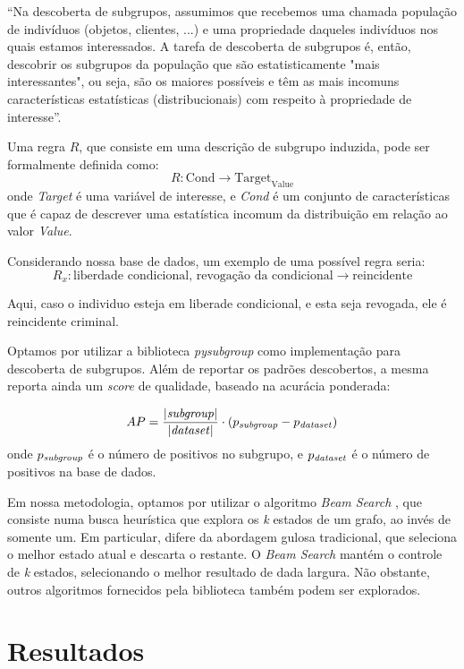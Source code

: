 \documentclass[12pt]{article}
\begin{document}
``Na descoberta de subgrupos, assumimos que recebemos uma chamada população de indivíduos
(objetos, clientes, ...) e uma propriedade daqueles indivíduos nos quais estamos interessados. A tarefa de descoberta de subgrupos é, então, descobrir os subgrupos da população que são estatisticamente "mais interessantes", ou seja, são os maiores possíveis e têm as mais incomuns características estatísticas (distribucionais) com respeito à propriedade de interesse''. \cite{Wrobel2001}

Uma regra $R$, que consiste em uma descrição de subgrupo induzida, pode ser formalmente
definida como: \cite{DBLP:journals/corr/abs-1106-4576}
\[
    R: \text{Cond} \rightarrow \text{Target}_{\text{Value}}
\]
onde \textit{Target} é uma variável de interesse, e \textit{Cond} é um conjunto de características que é capaz de descrever uma estatística incomum da distribuição em relação ao valor \textit{Value}.

Considerando nossa base de dados, um exemplo de uma possível regra seria:
\[
    R_x: \text{liberdade condicional, revogação da condicional} \rightarrow \text{reincidente}
\]

Aqui, caso o individuo esteja em liberade condicional, e esta seja revogada, ele é reincidente criminal.

Optamos por utilizar a biblioteca \textit{pysubgroup} \cite{lemmerich2018pysubgroup} como implementação para descoberta de subgrupos. Além de reportar os padrões descobertos, a mesma reporta ainda um \textit{score} de qualidade, baseado na acurácia ponderada:

\[
    AP = \frac{|\text{\textit{subgroup}}|}{|\text{\textit{dataset}}|} \cdot (p_{\text{\textit{subgroup}}} - p_{\text{\textit{dataset}}})
\]
onde $p_{\text{\textit{subgroup}}}$ é o número de positivos no subgrupo, e $p_{\text{\textit{dataset}}}$ é o número de positivos na base de dados.

Em nossa metodologia, optamos por utilizar o algoritmo \textit{Beam Search} \cite{10.5555/3327757.3327953}, que consiste numa busca heurística que explora os \textit{k} estados de um grafo, ao invés de somente um. Em particular, difere da abordagem gulosa tradicional, que seleciona o melhor estado atual e descarta o restante. O \textit{Beam Search} mantém o controle de \textit{k} estados, selecionando o melhor resultado de dada largura. Não obstante, outros algoritmos fornecidos pela biblioteca também podem ser explorados.

\pagebreak

\section{Resultados}
\end{document}
